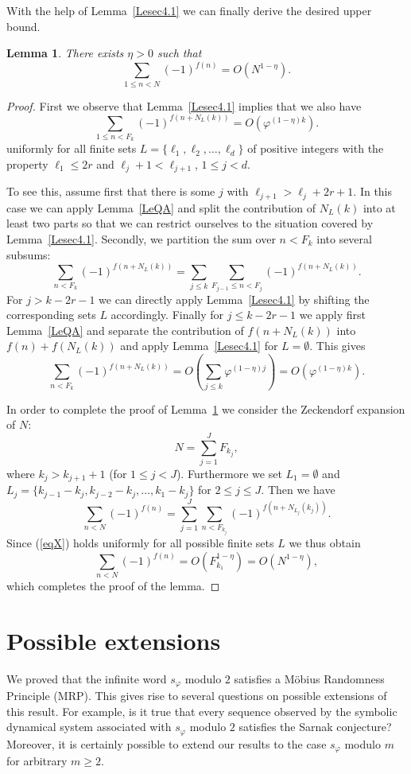 \documentclass[12pt]{amsart}
\newtheorem{lemma}{Lemma}
\begin{document}
With the help of Lemma~\ref{Lesec4.1} we can finally derive the desired upper bound.

\begin{lemma}\label{Lesec4.2}
There exists $\eta> 0$ such that 
\[
\sum_{1 \le n < N} (-1)^{f(n)} = O\left( N^{1-\eta} \right).
\]
\end{lemma}

\begin{proof}
First we observe that Lemma~\ref{Lesec4.1} implies that we also have 
\begin{equation}\label{eqX}
\sum_{1\leq n < F_k} (-1)^{f(n+N_L(k))} = O\left( \varphi^{(1-\eta) k} \right).
\end{equation}
uniformly for all finite sets $L = \{\ell_1, \ell_2, \ldots, \ell_d\}$ of positive integers with the property
$\ell_1 \le 2r$ and $\ell_j + 1 < \ell_{j+1}$, $1\le j < d$.

To see this, assume first that there is some $j$ with $\ell_{j+1} > \ell_j + 2r+1$.
In this case we can apply Lemma~\ref{LeQA} and split the contribution of $N_L(k)$ into at least two parts so that we can restrict ourselves to the situation covered by Lemma~\ref{Lesec4.1}.
Secondly, we partition the sum over $n< F_k$ into several subsums:
\[
\sum_{n < F_k} (-1)^{f(n+N_L(k))} = \sum_{j\le k} \sum_{F_{j-1}\le n < F_j} (-1)^{f(n+N_L(k))}.
\]
For $j> k - 2r-1$ we can directly apply Lemma~\ref{Lesec4.1} by shifting the corresponding sets $L$ accordingly.
Finally for $j\le k-2r-1$ we apply first Lemma~\ref{LeQA} and separate the contribution of $f(n + N_L(k))$ into $f(n) + f(N_L(k))$ and apply Lemma~\ref{Lesec4.1} for $L = \emptyset$.
This gives
\[
\sum_{n < F_k} (-1)^{f(n+N_L(k))} = O\left( \sum_{j\le k} \varphi^{(1-\eta) j} \right) =
O\left( \varphi^{(1-\eta) k} \right). 
\]

In order to complete the proof of Lemma~\ref{Lesec4.2} we consider the Zeckendorf expansion of $N$:
\[
N = \sum_{j=1}^J  F_{k_j},
\]
where $k_j > k_{j+1} +1$ (for $1\le j< J$). Furthermore we set $L_1 = \emptyset$ and
$L_j = \{ k_{j-1}-k_j, k_{j-2}-k_j,\ldots, k_1-k_j \}$ for $2\le j \le J$. Then we have
\[
\sum_{n< N} (-1)^{f(n)} = \sum_{j=1}^J \sum_{n < F_{k_j}} (-1)^{f(n + N_{L_j}(k_j))}.
\]
Since (\ref{eqX}) holds uniformly for all possible finite sets $L$ we thus obtain
\[
\sum_{n< N} (-1)^{f(n)} = O\left( F_{k_1}^{1-\eta} \right) = O\left( N^{1-\eta} \right),
\]
which completes the proof of the lemma.
\end{proof}

\section{Possible extensions}
We proved that the infinite word $s_\varphi$ modulo $2$ satisfies a M\"obius Randomness Principle (MRP).
This gives rise to several questions on possible extensions of this result. 
For example, is it true that every sequence observed by the symbolic dynamical system associated with $s_\varphi$ modulo $2$ satisfies the Sarnak conjecture?
Moreover, it is certainly possible to extend our results to the case $s_\varphi$ modulo $m$ for arbitrary $m\geq 2$.
\end{document}
